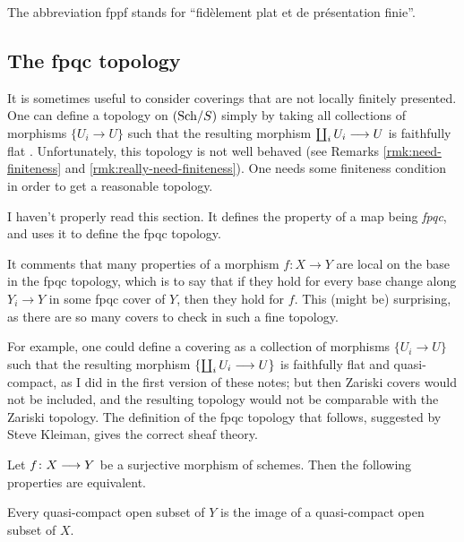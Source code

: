 \begin{2   CONTRAVARIANT FUNCTORS}
\begin{2.3 Sheaves in Grothendieck topologies}
\begin{example}
The  abbreviation fppf stands for ``fid\`element plat et de pr\'esentation finie''.
\end{example}




\subsection{The fpqc topology}\label{subsec:fpqc}

It is sometimes useful to consider coverings that are not locally finitely presented. One can define a topology on $({\mathrm{Sch}/S})$ simply by taking all collections of morphisms $\{U_i \to U\}$ such that the resulting morphism $\coprod_i U_i \arr U$ is faithfully flat%
. Unfortunately, this topology is not well behaved (see Remarks \ref{rmk:need-finiteness} and \ref{rmk:really-need-finiteness}). One needs some finiteness condition in order to get a reasonable topology. 
\begin{shaded}
I haven't properly read this section. It defines the property of a map being \emph{fpqc}, and uses it to define the fpqc topology.

It comments that many properties of a morphism $f:X\to Y$ are local on the base in the fpqc topology, which is to say that if they hold for every base change along $Y_i\to Y$ in some fpqc cover of $Y$, then they hold for $f$. This (might be) surprising, as there are so many covers to check in such a fine topology.
\end{shaded}


For example, one could define a covering as a collection of morphisms $\{U_i \to U\}$ such that the resulting morphism $\{\coprod_i U_i \arr U\}$ is faithfully flat and quasi-compact, as I did in the first version of these notes; but then Zariski covers would not be included, and the resulting topology would not be comparable with the Zariski topology. The definition of the fpqc topology that follows, suggested by Steve Kleiman, gives the correct sheaf theory.

\begin{proposition}
Let $f \colon X \arr Y$ be a surjective morphism of schemes. Then the following properties are equivalent.

\begin{enumeratei}

 Every quasi-compact open subset of $Y$ is the image of a quasi-compact open subset of $X$.


\end{enumeratei}
\end{proposition}
\end{2.3 Sheaves in Grothendieck topologies}
\end{2   CONTRAVARIANT FUNCTORS}
